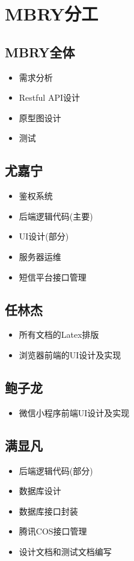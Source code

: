 \chapter{MBRY分工}

\section{MBRY全体}  
\begin{itemize}
    \item 需求分析 
    \item Restful API设计
    \item 原型图设计
    \item 测试
\end{itemize}

\section{尤嘉宁}

\begin{itemize}
    \item 鉴权系统
    \item 后端逻辑代码(主要)
    \item UI设计(部分)
    \item 服务器运维 
    \item 短信平台接口管理
\end{itemize}
        
\section{任林杰}

\begin{itemize}
    \item 所有文档的Latex排版
    \item 浏览器前端的UI设计及实现
\end{itemize}

\section{鲍子龙}

\begin{itemize}
    \item 微信小程序前端UI设计及实现
\end{itemize}

\section{满显凡}

\begin{itemize}
    \item 后端逻辑代码(部分)
    \item 数据库设计
    \item 数据库接口封装
    \item 腾讯COS接口管理
    \item 设计文档和测试文档编写
\end{itemize}